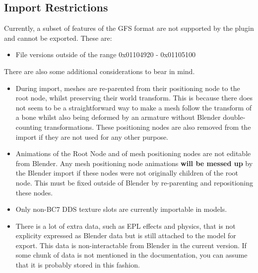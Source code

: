 \documentclass{article}
\begin{document}
\subsection{Import Restrictions}
Currently, a subset of features of the GFS format are not supported by the plugin and cannot be exported. These are:
\begin{itemize}
\item File versions outside of the range 0x01104920 - 0x01105100
\end{itemize}
\noindent
There are also some additional considerations to bear in mind.
\begin{itemize}
\item During import, meshes are re-parented from their positioning node to the root node, whilst preserving their world transform. This is because there does not seem to be a straightforward way to make a mesh follow the transform of a bone whilst also being deformed by an armature without Blender double-counting transformations. These positioning nodes are also removed from the import if they are not used for any other purpose.
\item Animations of the Root Node and of mesh positioning nodes are not editable from Blender. Any mesh positioning node animations \textbf{will be messed up} by the Blender import if these nodes were not originally children of the root node. This must be fixed outside of Blender by re-parenting and repositioning these nodes.
\item Only non-BC7 DDS texture slots are currently importable in models.
\item There is a lot of extra data, such as EPL effects and physics, that is not explicity expressed as Blender data but is still attached to the model for export. This data is non-interactable from Blender in the current version. If some chunk of data is not mentioned in the documentation, you can assume that it is probably stored in this fashion.
\end{itemize}

\clearpage 
\end{document}
